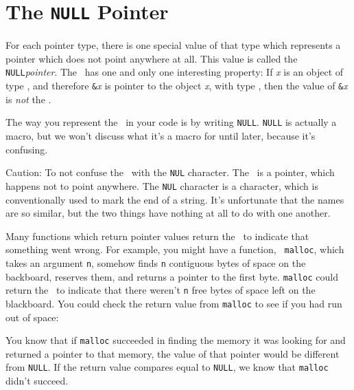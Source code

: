 %
%
%

\section{The {\tt NULL} Pointer}

For each pointer type, there is one special value of that type which
represents a pointer which does not point anywhere at all.  This value
is called the {\tt NULL}{\em pointer}\/.  The \np\ has one and only one
interesting property:  If {\em x}\/ is an object of type ,
and therefore {\tt\&}{\em x}\/ is pointer to the object {\em x}\/, with
type , then the value of {\tt\&}{\em x}\/ is {\em not} the \np.

The way you represent the \np\ in your code is by writing {\tt NULL}.
{\tt NULL} is actually a macro, but we won't discuss what it's a macro
for until later, because it's confusing.

Caution:  To not confuse the \np\ with the {\tt NUL} character.  The
\np\ is a pointer, which happens not to point anywhere.  The {\tt NUL}
character is a character, which is conventionally used to mark the end
of a string.  It's unfortunate that the names are so similar, but the
two things have nothing at all to do with one another.

Many functions which return pointer values return the \np\ to indicate
that something went wrong.  For example, you might have a function, {\tt
malloc}, which takes an argument {\tt n}, somehow finds {\tt n}
contiguous bytes of space on the backboard, reserves them, and returns a
pointer to the first byte.  {\tt malloc} could return the \np\ to
indicate that there weren't {\tt n} free bytes of space left on the
blackboard.  You could check the return value from {\tt malloc} to see
if you had run out of space:  
\begin{flushleft}
\verb% char *buf;% \\*
\verb% buf = malloc(1000);% \\*
\verb% if (buf == NULL) {% \\*
\verb%   printf("Out of memory.\n"); % \\*
\verb%   abort();% \\*
\verb% }% \\*
\verb% . . . %
\end{flushleft}

You know that if {\tt malloc} succeeded in finding the memory it was
looking for and returned a pointer to that memory, the value of that
pointer would be different from {\tt NULL}.  If the return value
compares equal to {\tt NULL}, we know that {\tt malloc} didn't succeed.

